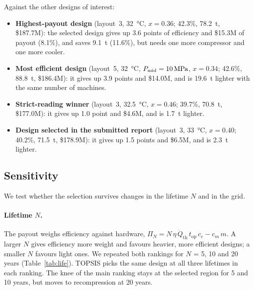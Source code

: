 Against the other designs of interest:
\begin{itemize}
  \item \textbf{Highest-payout design} (layout~3, \SI{32}{\celsius}, $x = 0.36$; 42.3\%, \SI{78.2}{t}, \$187.7M): the selected design gives up 3.6 points of efficiency and \$15.3M of payout (8.1\%), and saves \SI{9.1}{t} (11.6\%), but needs one more compressor and one more cooler.
  \item \textbf{Most efficient design} (layout~5, \SI{32}{\celsius}, $P_\mathrm{mid} = \SI{10}{MPa}$, $x = 0.34$; 42.6\%, \SI{88.8}{t}, \$186.4M): it gives up 3.9 points and \$14.0M, and is \SI{19.6}{t} lighter with the same number of machines.
  \item \textbf{Strict-reading winner} (layout~3, \SI{32.5}{\celsius}, $x = 0.46$; 39.7\%, \SI{70.8}{t}, \$177.0M): it gives up 1.0 point and \$4.6M, and is \SI{1.7}{t} lighter.
  \item \textbf{Design selected in the submitted report} (layout~3, \SI{33}{\celsius}, $x = 0.40$; 40.2\%, \SI{71.5}{t}, \$178.9M): it gives up 1.5 points and \$6.5M, and is \SI{2.3}{t} lighter.
\end{itemize}


\subsection{Sensitivity}
We test whether the selection survives changes in the lifetime $N$ and in the grid.

\paragraph{Lifetime $N$.} The payout weighs efficiency against hardware, $\Pi_N = N\,\eta\,\dot Q_\mathrm{th}\,t_\mathrm{op}\,c_e - c_m\,m$. A larger $N$ gives efficiency more weight and favours heavier, more efficient designs; a smaller $N$ favours light ones. We repeated both rankings for $N$ = 5, 10 and 20 years (Table~\ref{tab:life}). TOPSIS picks the same design at all three lifetimes in each ranking. The knee of the main ranking stays at the selected region for 5 and 10 years, but moves to recompression at 20 years.

